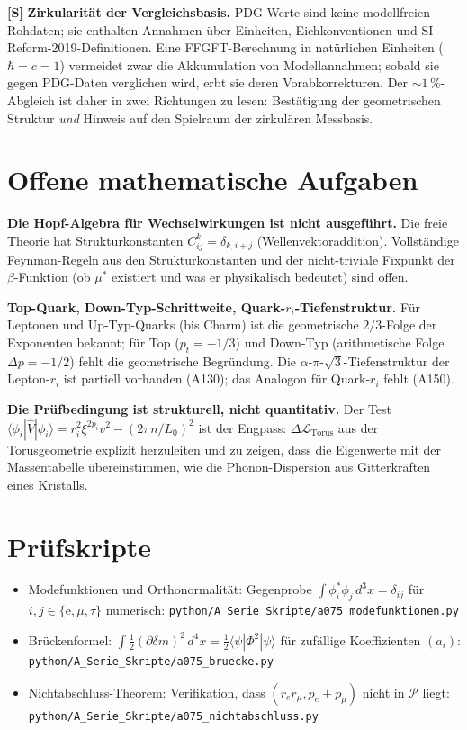 \textbf{[S]} \textbf{Zirkularität der Vergleichsbasis.} PDG-Werte sind keine
modellfreien Rohdaten; sie enthalten Annahmen über Einheiten,
Eichkonventionen und SI-Reform-2019-Definitionen. Eine FFGFT-Berechnung in
natürlichen Einheiten ($\hbar=c=1$) vermeidet zwar die Akkumulation von
Modellannahmen; sobald sie gegen PDG-Daten verglichen wird, erbt sie deren
Vorabkorrekturen. Der $\sim1\,\%$-Abgleich ist daher in zwei Richtungen zu
lesen: Bestätigung der geometrischen Struktur \emph{und} Hinweis auf den
Spielraum der zirkulären Messbasis.

\section{Offene mathematische Aufgaben}

\textbf{Die Hopf-Algebra für Wechselwirkungen ist nicht ausgeführt.} Die freie
Theorie hat Strukturkonstanten $C_{ij}^k=\delta_{k,i+j}$ (Wellenvektoraddition).
Vollständige Feynman-Regeln aus den Strukturkonstanten und der nicht-triviale
Fixpunkt der $\beta$-Funktion (ob $\mu^*$ existiert und was er physikalisch
bedeutet) sind offen.

\textbf{Top-Quark, Down-Typ-Schrittweite, Quark-$r_i$-Tiefenstruktur.} Für
Leptonen und Up-Typ-Quarks (bis Charm) ist die geometrische $2/3$-Folge der
Exponenten bekannt; für Top ($p_t=-1/3$) und Down-Typ (arithmetische Folge
$\Delta p=-1/2$) fehlt die geometrische Begründung. Die
$\alpha$-$\pi$-$\sqrt3$-Tiefenstruktur der Lepton-$r_i$ ist partiell vorhanden
(A130); das Analogon für Quark-$r_i$ fehlt (A150).

\textbf{Die Prüfbedingung ist strukturell, nicht quantitativ.} Der Test
$\langle\phi_i|\hat V|\phi_i\rangle = r_i^2\xi^{2p_i}v^2-(2\pi n/L_0)^2$ ist
der Engpass: $\Delta\mathcal L_\text{Torus}$ aus der Torusgeometrie explizit
herzuleiten und zu zeigen, dass die Eigenwerte mit der Massentabelle
übereinstimmen, wie die Phonon-Dispersion aus Gitterkräften eines Kristalls.

\section{Prüfskripte}

\begin{itemize}[leftmargin=2em,itemsep=2pt,topsep=2pt]
  \item Modefunktionen und Orthonormalität: Gegenprobe
    $\int\phi_i^*\phi_j\,d^3x=\delta_{ij}$ für $i,j\in\{\text{e},\mu,\tau\}$
    numerisch:
    \texttt{python/A\_Serie\_Skripte/a075\_modefunktionen.py}
  \item Brückenformel: $\int\tfrac12(\partial\delta m)^2\,d^4x
    = \tfrac12\langle\psi|\Phi^2|\psi\rangle$ für zufällige
    Koeffizienten $(a_i)$:
    \texttt{python/A\_Serie\_Skripte/a075\_bruecke.py}
  \item Nichtabschluss-Theorem: Verifikation, dass $(r_e r_\mu, p_e+p_\mu)$
    nicht in $\mathcal P$ liegt:
    \texttt{python/A\_Serie\_Skripte/a075\_nichtabschluss.py}
\end{itemize}


